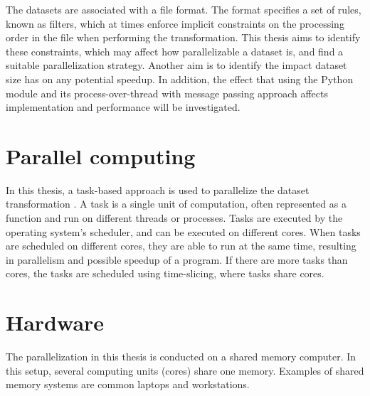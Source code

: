 The datasets are associated with a file format. The format specifies a set of rules, known as filters, which at times enforce
implicit constraints on the processing order in the file when performing the transformation. This thesis aims to identify these
constraints, which may affect how parallelizable a dataset is, and find a suitable parallelization strategy. Another aim is to identify the impact dataset size has on
any potential speedup. In addition, the effect that using the Python  module and its process-over-thread with message passing
approach affects implementation and performance will be investigated.

\section{Parallel computing}
In this thesis, a task-based approach is used to parallelize the dataset transformation \cite{chow_2015_pipeline_ppiaote}. A task is a single unit of computation, often represented as a function
and run on different threads or processes. Tasks are executed by the operating system's scheduler, and can be executed on different cores. When tasks are scheduled
on different cores, they are able to run at the same time, resulting in parallelism and possible speedup of a program. If there are more tasks than cores, the tasks
are scheduled using time-slicing, where tasks share cores.

\section{Hardware}
The parallelization in this thesis is conducted on a shared memory computer. In this setup, several computing units (cores) share one memory. Examples of
shared memory systems are common laptops and workstations.


